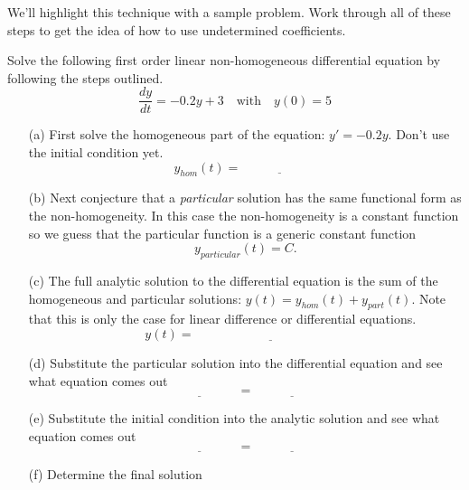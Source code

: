 We'll highlight this technique with a sample problem.  Work through all of these steps to
get the idea of how to use undetermined coefficients.
\begin{problem}
    Solve the following first order linear non-homogeneous differential equation by
    following the steps outlined.
    \[ \frac{dy}{dt} = -0.2 y + 3 \quad \text{with} \quad y(0) = 5 \]
    \begin{enumerate}
        \item[(a)] First solve the homogeneous part of the equation: $y' = -0.2y$.  Don't
            use the initial condition yet.
            \[ y_{hom}(t) = \underline{\hspace{1in}} \]
        \item[(b)] Next conjecture that a {\it particular} solution has the same functional
            form as the non-homogeneity.  In this case the non-homogeneity is a constant
            function so we guess that the particular function is a generic constant
            function
            \[ y_{particular}(t) = C. \]
        \item[(c)] The full analytic solution to the differential equation is the sum of the
            homogeneous and particular solutions: $y(t) = y_{hom}(t) + y_{part}(t)$.  Note
            that this is only the case for linear difference or differential equations.
            \[ y(t) = \underline{\hspace{2in}} \]
        \item[(d)] Substitute the particular solution into the differential equation and see
            what equation comes out
            \[ \underline{\hspace{1in}} = \underline{\hspace{1in}} \]
        \item[(e)] Substitute the initial condition into the analytic solution and see what
            equation comes out
            \[ \underline{\hspace{1in}} = \underline{\hspace{1in}} \]
        \item[(f)] Determine the final solution
    \end{enumerate}
\end{problem}

